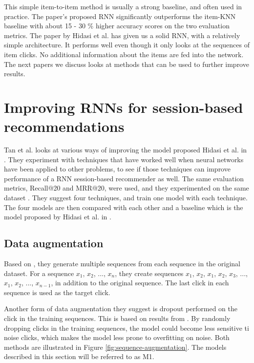 This simple item-to-item method is usually a strong baseline, and often used in practice. The paper's proposed RNN significantly outperforms the item-KNN baseline with about 15 - 30 \% higher accuracy scores on the two evaluation metrics. The paper by Hidasi et al. has given us a solid RNN, with a relatively simple architecture. It performs well even though it only looks at the sequences of item clicks. No additional information about the items are fed into the network. The next papers we discuss looks at methods that can be used to further improve results.



\section{Improving RNNs for session-based recommendations}
Tan et al. \cite{DBLP:journals/corr/TanXL16} looks at various ways of improving the model proposed Hidasi et al. in \cite{DBLP:journals/corr/HidasiKBT15}. They experiment with techniques that have worked well when neural networks have been applied to other problems, to see if those techniques can improve performance of a RNN session-based recommender as well. The same evaluation metrics, Recall@20 and MRR@20, were used, and they experimented on the same dataset \cite{dataset:recsys15}. They suggest four techniques, and train one model with each technique. The four models are then compared with each other and a baseline which is the model proposed by Hidasi et al. in \cite{DBLP:journals/corr/HidasiKBT15}.

\subsection{Data augmentation}
Based on \cite{DBLP:journals/corr/BrebissonSAVB15}, they generate multiple sequences from each sequence in the original dataset. For a sequence \lbrack $x_1$, $x_2$, ..., $x_n$\rbrack, they create sequences \lbrack $x_1$, $x_2$\rbrack, \lbrack $x_1$, $x_2$, $x_3$\rbrack, ..., \lbrack $x_1$, $x_2$, ..., $x_{n-1}$\rbrack, in addition to the original sequence. The last click in each sequence is used as the target click.

Another form of data augmentation they suggest is dropout performed on the click in the training sequences. This is based on results from \cite{rnn-dropout}. By randomly dropping clicks in the training sequences, the model could become less sensitive ti noise clicks, which makes the model less prone to overfitting on noise. Both methods are illustrated in Figure \ref{fig:sequence-augmentation}. The models described in this section will be referred to as M1.

